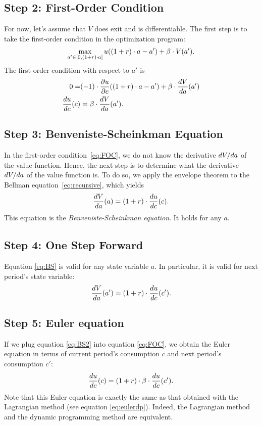 \documentclass[letterpaper,12pt,leqno]{article}
\begin{document}
\subsection{Step 2: First-Order Condition}

For now, let's assume that $V$ does exit and is differentiable. The first step is to take the first-order condition in the optimization program:
\begin{equation*}
\max_{a'\in[0,(1+r)\cdot a]} u((1+r)\cdot a-a')+\b \cdot V(a').
\end{equation*}
The first-order condition with respect to $a'$ is
\begin{align}
0=&(-1)\cdot \frac{\partial u}{\partial c}((1+r)\cdot a-a')+\beta \cdot \frac{d V}{d a}(a')\nonumber\\
\frac{d u}{d c}(c)&=\beta \cdot \frac{d V}{d a}(a').\label{eq:FOC}
\end{align}

\subsection{Step 3: Benveniste-Scheinkman Equation}

In the first-order condition~\eqref{eq:FOC}, we do not know  the derivative $d V/d a$ of the value function. Hence, the next step is to determine what the derivative $d V/d a$ of the value function is. To do so, we apply the envelope theorem to the Bellman equation~\eqref{eq:recursive}, which yields
\begin{equation}
 \frac{d V}{d a}(a)=(1+r)\cdot \frac{d u}{d c}(c).\label{eq:BS}
\end{equation}
This equation is the \textit{Benveniste-Scheinkman equation}. It holds for any $a$.

\subsection{Step 4: One Step Forward}

Equation \eqref{eq:BS} is valid for any state variable $a$. In particular, it is valid for next period's state variable:
\begin{equation}
\frac{d V}{d a}(a')=(1+r)\cdot \frac{d u}{d c}(c').\label{eq:BS2}
\end{equation}

\subsection{Step 5: Euler equation}

If we plug equation \eqref{eq:BS2} into equation \eqref{eq:FOC}, we obtain the Euler equation in terms of current period's consumption $c$ and next period's consumption $c'$:
\begin{equation}
\frac{d u}{d c}(c)=(1+r)\cdot \beta \cdot \frac{d u}{d c}(c').\label{Euler}
\end{equation}
Note that this Euler equation is exactly the same as that obtained with the Lagrangian method (see equation \eqref{eq:eulerdp}). Indeed, the Lagrangian method and the dynamic programming method are equivalent.
\end{document}

